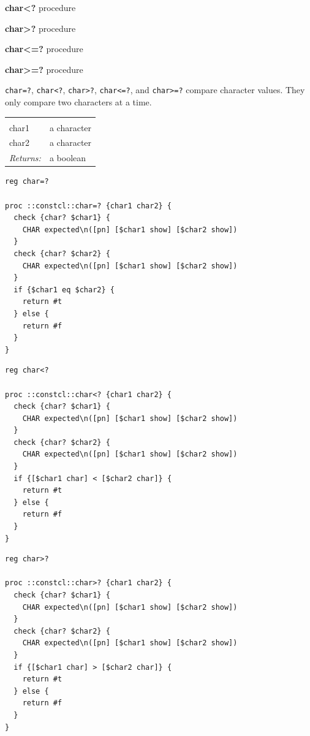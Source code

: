 \documentclass[twoside]{report}
\begin{document}
\noindent \textbf{char<?} procedure

\noindent \textbf{char>?} procedure

\noindent \textbf{char<=?} procedure

\noindent \textbf{char>=?} procedure

\texttt{char=?}, \texttt{char<?}, \texttt{char>?}, \texttt{char<=?}, and \texttt{char>=?} compare character values. They only compare two characters at a time.

\noindent\begin{tabular}{ |p{1.9cm} p{8cm}| }
\hline
\rowcolor[HTML]{CCCCCC} \multicolumn{2}{|l|}{\bf char=?, char<?, char>?, char<=?, char>=? (public)} \\
char1 & a character \\
char2 & a character \\
\textit{Returns:} & a boolean \\
\hline
\end{tabular}

\begin{lstlisting}
reg char=?

proc ::constcl::char=? {char1 char2} {
  check {char? $char1} {
    CHAR expected\n([pn] [$char1 show] [$char2 show])
  }
  check {char? $char2} {
    CHAR expected\n([pn] [$char1 show] [$char2 show])
  }
  if {$char1 eq $char2} {
    return #t
  } else {
    return #f
  }
}
\end{lstlisting}

\begin{lstlisting}
reg char<?

proc ::constcl::char<? {char1 char2} {
  check {char? $char1} {
    CHAR expected\n([pn] [$char1 show] [$char2 show])
  }
  check {char? $char2} {
    CHAR expected\n([pn] [$char1 show] [$char2 show])
  }
  if {[$char1 char] < [$char2 char]} {
    return #t
  } else {
    return #f
  }
}
\end{lstlisting}

\begin{lstlisting}
reg char>?

proc ::constcl::char>? {char1 char2} {
  check {char? $char1} {
    CHAR expected\n([pn] [$char1 show] [$char2 show])
  }
  check {char? $char2} {
    CHAR expected\n([pn] [$char1 show] [$char2 show])
  }
  if {[$char1 char] > [$char2 char]} {
    return #t
  } else {
    return #f
  }
}
\end{lstlisting}
\end{document}
